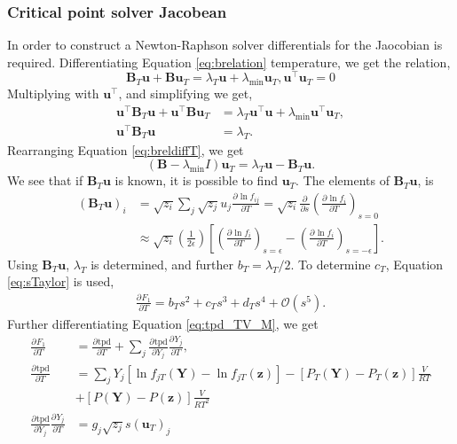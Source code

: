 \documentclass[internal,english]{sintefmemo2012}
\newcommand*{\pd}[3][]{\frac{\partial^{#1}#2}{\partial{#3}^{#1}}}%
\newcommand{\wrpt}{\text{with respect to~}}
\newcommand{\tpd}{\ensuremath{\text{tpd}}\xspace}
\begin{document}
\subsubsection{Critical point solver Jacobean}
In order to construct a Newton-Raphson solver differentials for the Jaocobian is
required.  Differentiating Equation \ref{eq:brelation} \wrpt temperature, we get
the relation,
\begin{equation}
\mathbf{B}_T \mathbf{u} + \mathbf{B} \mathbf{u}_T = \lambda_{T} \mathbf{u} + \lambda_{\text{min}} \mathbf{u}_T, \mathbf{u}^\intercal\mathbf{u}_T = 0
\label{eq:breldiffT}
\end{equation}
Multiplying with $\mathbf{u}^\intercal$, and simplifying we get,
\begin{align}
\mathbf{u}^\intercal \mathbf{B}_T \mathbf{u} + \mathbf{u}^\intercal\mathbf{B} \mathbf{u}_T &= \lambda_{T} \mathbf{u}^\intercal\mathbf{u} + \lambda_{\text{min}} \mathbf{u}^\intercal\mathbf{u}_T,\\
\mathbf{u}^\intercal \mathbf{B}_T \mathbf{u}  &= \lambda_{T}.
\label{eq:breldiffTuT}
\end{align}
Rearranging Equation \ref{eq:breldiffT}, we get
\begin{equation}
\left(\mathbf{B} - \lambda_{\text{min}}I\right) \mathbf{u}_T = \lambda_{T} \mathbf{u}  - \mathbf{B}_T \mathbf{u}.
\label{eq:breldiffTR}
\end{equation}
We see that if $\mathbf{B}_T \mathbf{u}$ is known, it is possible to
find $\mathbf{u}_T$. The elements of $\mathbf{B}_T \mathbf{u}$, is
\begin{align}
\label{eq:Btu}
  \left(\mathbf{B}_T \mathbf{u}\right)_i &= \sqrt{z_i}\underset{j}{\sum}\sqrt{z_j}u_j \pd{\ln f_{ij}}{T} = \sqrt{z_i} \pd{}{s}\left(\pd{\ln f_{i}}{T}\right)_{s=0} \\ 
                                         &\approx \sqrt{z_i} \left(\frac{1}{2\epsilon}\right)\left[\left(\pd{\ln f_{i}}{T}\right)_{s=\epsilon} - \left(\pd{\ln f_{i}}{T}\right)_{s=-\epsilon} \right].
\end{align}
Using $\mathbf{B}_T \mathbf{u}$, $\lambda_T$ is determined, and further $b_T = \lambda_T/2$. To determine $c_T$, Equation \ref{eq:sTaylor} is used,
\begin{align}
\pd{F_1}{T} = b_Ts^2 + c_Ts^3 + d_Ts^4 + \mathcal{O}(s^5).
\label{eq:dF1dT_Taylor}
\end{align}
Further differentiating Equation \ref{eq:tpd_TV_M}, we get
\begin{align}
\label{eq:dF1dT}
\pd{F_1}{T} &= \pd{\tpd}{T} +
  \underset{j}{\sum}\pd{\tpd}{Y_j}\pd{Y_j}{T},\\
\pd{\tpd}{T} &= \underset{j}{\sum}Y_j\left[\ln f_{jT} \left(\mathbf{Y}\right) -
     \ln f_{jT}\left(\mathbf{z}\right)\right] -
   \left[P_T\left(\mathbf{Y}\right) -
               P_T\left(\mathbf{z}\right)\right]\frac{V}{RT} \\ 
            &+\left[P\left(\mathbf{Y}\right) - P\left(\mathbf{z}\right)\right]\frac{V}{RT^2}\\
\pd{\tpd}{Y_j}\pd{Y_j}{T} &=g_j\sqrt{z_j}s(\mathbf{u}_T)_j
\end{align}
\end{document}
